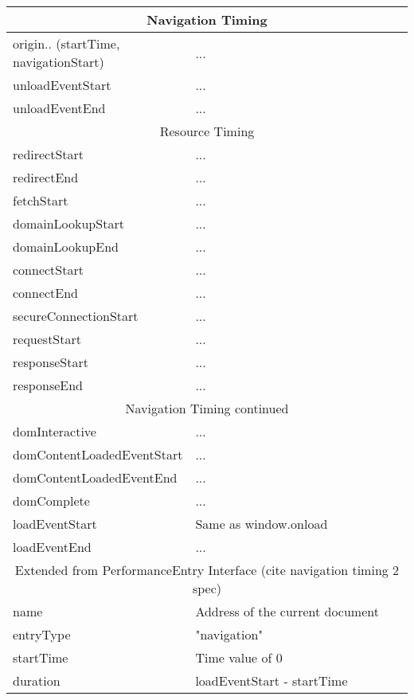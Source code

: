 \begin{center}
	\small
	\begin{longtable}{ | p{0.3\linewidth} | p{0.7\linewidth} | }
	\hline
	\multicolumn{2}{|c|}{Navigation Timing} \\
	\hline
	origin.. (startTime, navigationStart) & ... \\
	\hline
	unloadEventStart & ... \\
	\hline
	unloadEventEnd & ... \\

	\hline
	\multicolumn{2}{|c|}{Resource Timing} \\
	\hline
	redirectStart & ... \\
	\hline
	redirectEnd & ... \\
	\hline
	fetchStart & ... \\
	\hline
	domainLookupStart & ... \\
	\hline
	domainLookupEnd & ... \\
	\hline
	connectStart & ... \\
	\hline
	connectEnd & ... \\
	\hline
	secureConnectionStart & ... \\
	\hline
	requestStart & ... \\
	\hline
	responseStart & ... \\
	\hline
	responseEnd & ... \\
	\hline
	
	\multicolumn{2}{|c|}{Navigation Timing continued} \\
	\hline
	domInteractive & ... \\
	\hline
	domContentLoadedEventStart & ... \\
	\hline
	domContentLoadedEventEnd & ... \\
	\hline
	domComplete & ... \\
	\hline
	loadEventStart & Same as window.onload \\
	\hline
	loadEventEnd & ... \\
	
	\hline
	\multicolumn{2}{|c|}{Extended from PerformanceEntry Interface (cite navigation timing 2 spec)} \\
	\hline
	name & Address of the current document \\
	\hline
	entryType & "navigation" \\
	\hline
	startTime & Time value of 0 \\
	\hline
	duration & loadEventStart - startTime \\


\end{longtable}
\end{center}
